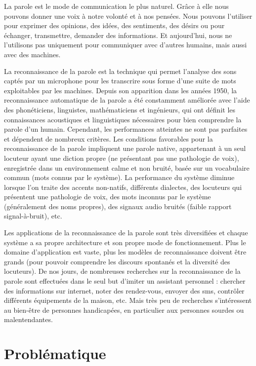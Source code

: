 \documentclass{style/these}
\begin{document}
La parole est le mode de communication le plus naturel. 
Grâce à elle nous pouvons donner une voix à notre volonté et à nos pensées. 
Nous pouvons l'utiliser pour exprimer des opinions, des idées, des sentiments, des désirs ou pour échanger, transmettre, demander des informations. 
Et aujourd'hui, nous ne l'utilisons pas uniquement pour communiquer avec d'autres humains, mais aussi avec des machines. 

La reconnaissance de la parole est la technique qui permet l'analyse des sons captés par un microphone pour les transcrire sous forme d'une suite de mots exploitables par les machines. 
Depuis son apparition dans les années 1950, la reconnaissance automatique de la parole a été constamment améliorée avec l'aide des phonéticiens, linguistes, mathématiciens et ingénieurs, qui ont définit les connaissances acoustiques et linguistiques nécessaires pour bien comprendre la parole d'un humain.
Cependant, les performances atteintes ne sont pas parfaites et dépendent de nombreux critères.
Les conditions favorables pour la reconnaissance de la parole impliquent une parole native, appartenant à un seul locuteur ayant une diction propre (ne présentant pas une pathologie de voix), enregistrée dans un environnement calme et non bruité, basée sur un vocabulaire commun (mots connus par le système). 
La performance du système diminue lorsque l'on traite des accents non-natifs, différents dialectes, des locuteurs qui présentent une pathologie de voix, des mots inconnus par le système (généralement des noms propres), des signaux audio bruités (faible rapport signal-à-bruit), etc.

Les applications de la reconnaissance de la parole sont très diversifiées et chaque système a sa propre architecture et son propre mode de fonctionnement. Plus le domaine d'application est vaste, plus les modèles de reconnaissance doivent être grands (pour pouvoir comprendre les discours spontanés et la diversité des locuteurs). 
De nos jours, de nombreuses recherches sur la reconnaissance de la parole sont effectuées dans le seul but d'imiter un assistant personnel : chercher des informations sur internet, noter des rendez-vous, envoyer des sms, contrôler différents équipements de la maison, etc. Mais très peu de recherches s'intéressent au bien-être de personnes handicapées, en particulier aux personnes sourdes ou malentendantes.

\section*{Problématique}
\renewcommand{\rightmark}{Problématique}
\end{document}
